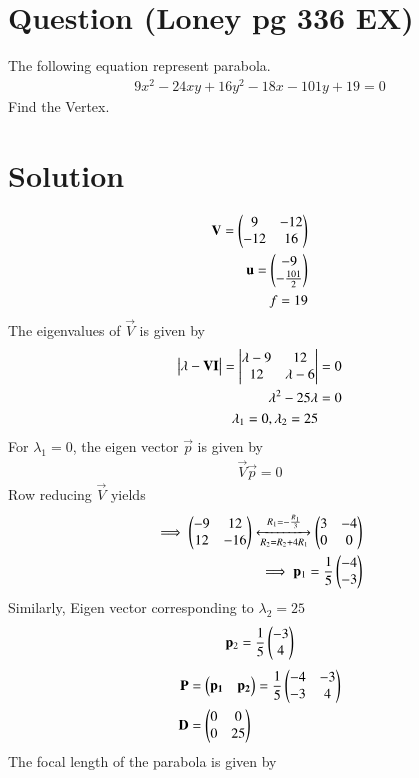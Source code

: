 \documentclass[journal,12pt,twocolumn]{IEEEtran}
\begin{document}
\section{Question (Loney pg 336 EX)}
The following equation represent parabola.
\begin{align}
9x^2-24xy+16y^2-18x-101y+19 = 0
\end{align}
Find the Vertex.
\section{Solution}
\begin{align}
\label{1}\mathbf{V} = \begin{pmatrix}9&-12\\-12&16\end{pmatrix}\\ 
\mathbf{u} = \begin{pmatrix}-9\\-\frac{101}{2}\end{pmatrix}\\ 
f = 19 \label{7}
\end{align}
The eigenvalues of $\vec{V}$ is given by
\begin{align}
\begin{vmatrix}\lambda-\mathbf{V}\mathbf{I}\end{vmatrix} = \begin{vmatrix}\lambda-9&12\\12&\lambda-6\end{vmatrix} &= 0\\
\lambda^2-25\lambda &= 0\label{2}\\
\lambda_1=0, \lambda_2=25\label{3}
\end{align}
For $\lambda_1 = 0$, the eigen vector $\vec{p}$ is given by
\begin{align}
    \vec{V}\vec{p} = 0
\end{align}
Row reducing $\vec{V}$ yields
\begin{align}
\implies
\begin{pmatrix}-9&12\\12&-16\end{pmatrix}\xleftrightarrow[R_2=R_2+4R_1]{R_1=-\frac{R_1}{3}}\begin{pmatrix}3&-4\\0&0\end{pmatrix}\\
\implies\mathbf{p}_1=\frac{1}{5}\begin{pmatrix}-4\\-3\end{pmatrix} \label{4}
\end{align}
Similarly, Eigen vector corresponding to $\lambda_2=25$ 
\begin{align}
\mathbf{p}_2=\frac{1}{5}\begin{pmatrix}-3\\4\end{pmatrix} 
\end{align}
\begin{align}
\mathbf{P}&=\begin{pmatrix}\mathbf{p_1}&\mathbf{p_2}\end{pmatrix}=\frac{1}{5}\begin{pmatrix}-4&-3\\ -3 &4\end{pmatrix} \\
\mathbf{D}&=\begin{pmatrix}0&0\\0&25\end{pmatrix}
\end{align}
The focal length of the parabola is given by 
\end{document}
